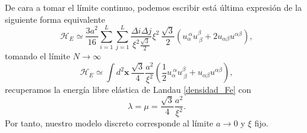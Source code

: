 De cara a tomar el límite continuo, podemos escribir está última expresión de
la siguiente forma equivalente 
\begin{equation*}
\mathcal{H}_E\simeq\frac{3a^2}{16}\sum_{i=1}^L\sum_{j=1}^L\frac{\Delta i\Delta j}{\xi^2\frac{\sqrt{3}}{2}}\xi^2\,\frac{\sqrt{3}}{2}(u_{\alpha}^{\ \alpha}u^{\beta}_{\ \beta}+2u_{\alpha\beta}u^{\alpha\beta}),
\end{equation*}
tomando el límite $N\rightarrow \infty$
\begin{equation*}
\mathcal{H}_E\simeq\int d^2\mathbf{x}\, \frac{\sqrt{3}}{4}\frac{a^2}{\xi^2}\left(\frac{1}{2}u_{\alpha}^{\ \alpha}u^{\beta}_{\ \beta}+u_{\alpha\beta}u^{\alpha\beta}\right),
\end{equation*}
recuperamos la energía libre elástica de Landau \eqref{densidad_Fe} con 
\begin{equation*}
\lambda=\mu=\frac{\sqrt{3}}{4}\frac{a^2}{\xi^2}.
\end{equation*}
Por tanto, nuestro modelo discreto corresponde al límite $a\rightarrow 0$ y $\xi$ fijo.

